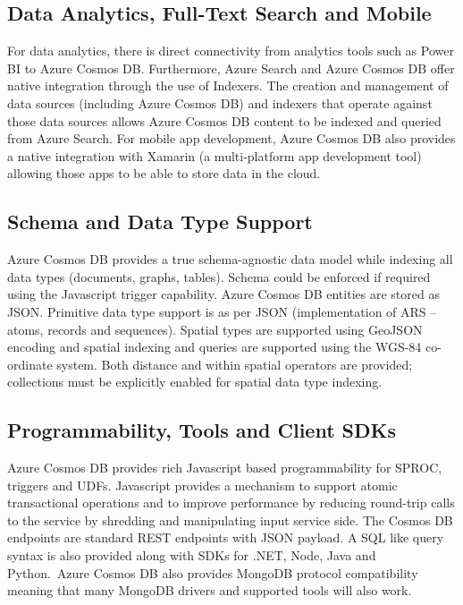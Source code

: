 \subsection{Data Analytics, Full-Text Search and Mobile}
For data analytics, there is direct connectivity from analytics tools such as Power BI to Azure Cosmos DB. Furthermore, Azure Search and Azure Cosmos DB offer native integration through the use of Indexers. The creation and management of data sources (including Azure Cosmos DB) and indexers that operate against those data sources allows Azure Cosmos DB content to be indexed and queried from Azure Search. For mobile app development, Azure Cosmos DB also provides a native integration with Xamarin (a multi-platform app development tool) allowing those apps to be able to store data in the cloud. 

\subsection{Schema and Data Type Support}
Azure Cosmos DB provides a true schema-agnostic data model while indexing all data types (documents, graphs, tables). Schema could be enforced if required using the Javascript trigger capability.
Azure Cosmos DB entities are stored as JSON. Primitive data type support is as per JSON (implementation of ARS – atoms, records and sequences). Spatial types are supported using GeoJSON encoding and spatial indexing and queries are supported using the WGS-84 co-ordinate system. Both distance and within spatial operators are provided; collections must be explicitly enabled for spatial data type indexing.

\subsection{Programmability, Tools and Client SDKs}
Azure Cosmos DB provides rich Javascript based programmability for SPROC, triggers and UDFs. Javascript provides a mechanism to support atomic transactional operations and to improve performance by reducing round-trip calls to the service by shredding and manipulating input service side.
The Cosmos DB endpoints are standard REST endpoints with JSON payload. A SQL like query syntax is also provided along with SDKs for .NET, Node, Java and Python. Azure Cosmos DB also provides MongoDB protocol compatibility meaning that many MongoDB drivers and supported tools will also work.


